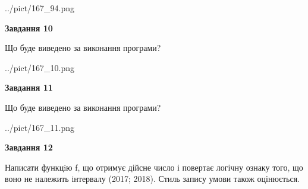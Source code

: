 \documentclass[12pt, ukrainian]{article}
\begin{document}
{\begin {large}
\begin{center}
	{../pict/167_94.png}
\end{center}
\newpage

{\begin {center}\textbf{Завдання 10}\end {center}}

Що буде виведено за виконання програми?\par
\begin{center}
	{../pict/167_10.png}
\end{center}
\newpage

{\begin {center}\textbf{Завдання 11}\end {center}}

Що буде виведено за виконання програми?\par
\begin{center}
	{../pict/167_11.png}
\end{center}
\newpage

{\begin {center}\textbf{Завдання 12}\end {center}}


Написати функцiю f, що отримує дійсне число і повертає логічну ознаку того, що воно не належить iнтервалу (2017; 2018). Стиль запису умови також оцінюється.\par
\newpage

\end {large}}
\end{document}

